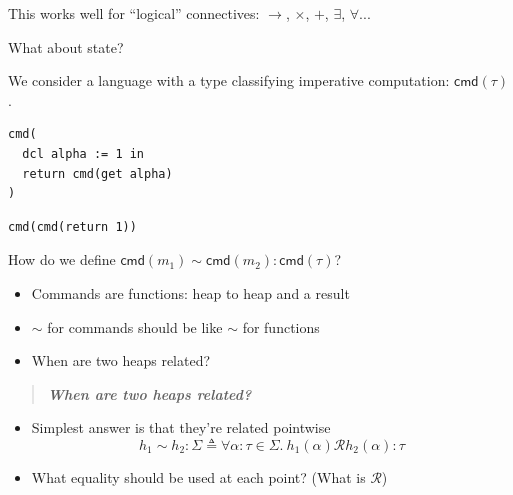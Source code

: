 \documentclass{beamer}
\newcommand{\relR}{\ensuremath{\mathrel{\mathcal{R}}}}
\newcommand{\defs}{\ensuremath{\mathrel{\triangleq}}}
\newcommand{\cmd}[1]{\ensuremath{\mathsf{cmd}(#1)}}
\begin{document}
\begin{frame}
  \centering
  This works well for ``logical'' connectives: $\to$, $\times$, $+$,
  $\exists$, $\forall$...
\end{frame}

\begin{frame}
  \centering
  What about state?

  \pause
  \bigskip

  We consider a language with a type classifying imperative
  computation: $\cmd{\tau}$.
\end{frame}

\begin{frame}[fragile]
  \centering
  \begin{minipage}{0.5\textwidth}
    \centering
\begin{lstlisting}
cmd(
  dcl alpha := 1 in
  return cmd(get alpha)
)
\end{lstlisting}
  \end{minipage}%
  \begin{minipage}{0.5\textwidth}
    \centering
\begin{lstlisting}
cmd(cmd(return 1))
\end{lstlisting}
  \end{minipage}
\end{frame}

\begin{frame}
  \centering
  How do we define $\cmd{m_1} \sim \cmd{m_2} : \cmd{\tau}$?
  \pause
  \bigskip
  \begin{itemize}
  \item Commands are functions: heap to heap and a result
  \item $\sim$ for commands should be like $\sim$ for functions
  \item When are two heaps related?
  \end{itemize}
\end{frame}

\begin{frame}
  \begin{quote}\centering
    \bf\it When are two heaps related?
  \end{quote}

  \begin{itemize}
  \item Simplest answer is that they're related pointwise\\
    \[
      h_1 \sim h_2 : \Sigma \defs
      \forall \alpha : \tau \in \Sigma.\ h_1(\alpha) \relR h_2(\alpha) : \tau
    \]
  \item What equality should be used at each point? (What is $\relR$)
  \end{itemize}
\end{frame}
\end{document}
